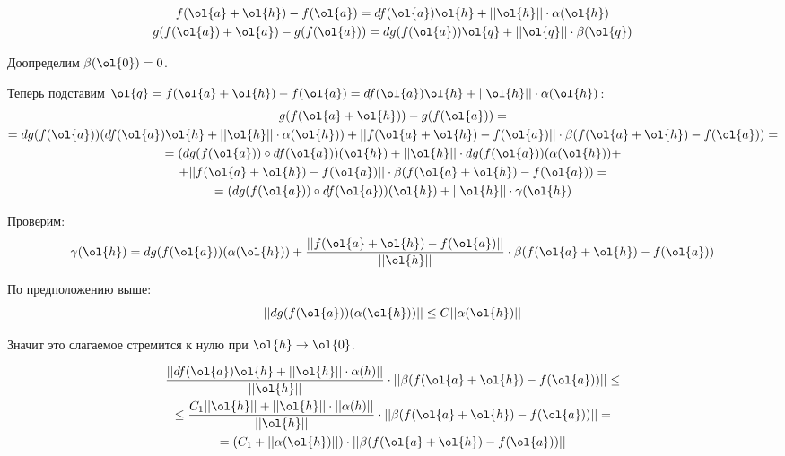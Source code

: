 \begin{gather*}
    f(\ol{a} + \ol{h}) - f(\ol{a}) = df(\ol{a}) \ol{h} + || \ol{h} || \cdot \alpha (\ol{h})
    \\
    g(f(\ol{a}) + \ol{a}) - g(f(\ol{a})) = dg(f(\ol{a})) \ol{q} + || \ol{q} || \cdot \beta (\ol{q})
\end{gather*}

Доопределим \( \beta(\ol{0}) = 0 \).

Теперь подставим \( \ol{q} = f(\ol{a} + \ol{h}) - f(\ol{a}) = df(\ol{a}) \ol{h} + || \ol{h} || \cdot \alpha (\ol{h}) \):
\begin{gather*}
    g(f(\ol{a} + \ol{h})) - g(f(\ol{a}))
    =
    \\
    =
    dg(f(\ol{a})) ( df(\ol{a}) \ol{h} + || \ol{h} || \cdot \alpha (\ol{h}) )
        +
        || f(\ol{a} + \ol{h}) - f(\ol{a}) || \cdot \beta (f(\ol{a} + \ol{h}) - f(\ol{a}))
    =
    \\
    =
    (dg(f(\ol{a})) \circ df (\ol{a})) ( \ol{h} )
        +
        || \ol{h} || \cdot dg ( f(\ol{a}) ) ( \alpha(\ol{h}) )
        +
        \\
        +
        || f(\ol{a} + \ol{h}) - f(\ol{a}) || \cdot \beta (f(\ol{a} + \ol{h}) - f(\ol{a}))
    =
    \\
    =
    (dg(f(\ol{a})) \circ df (\ol{a})) ( \ol{h} ) + || \ol{h} || \cdot \gamma (\ol{h})
\end{gather*}

Проверим:
\[
    \gamma(\ol{h})
    =
    dg ( f(\ol{a}) ) ( \alpha(\ol{h}) )
    +
    \frac{|| f(\ol{a} + \ol{h}) - f(\ol{a}) ||}{|| \ol{h} ||} \cdot \beta (f(\ol{a} + \ol{h}) - f(\ol{a}))
\]

По предположению выше:
\[
    || dg ( f(\ol{a}) ) ( \alpha(\ol{h}) ) || \leq C || \alpha ( \ol{h} ) ||
\]

Значит это слагаемое стремится к нулю при \( \ol{h} \to \ol{0} \).

\begin{gather*}
    \frac{|| df(\ol{a}) \ol{h} + || \ol{h} || \cdot \alpha(h) ||}{|| \ol{h} ||} \cdot || \beta (f(\ol{a} + \ol{h}) - f(\ol{a})) ||
    \leq
    \\
    \leq
    \frac{C_1 || \ol{h} || + || \ol{h} || \cdot || \alpha(h) ||}{|| \ol{h} ||} \cdot || \beta (f(\ol{a} + \ol{h}) - f(\ol{a})) ||
    =
    \\
    =
    (C_1 + || \alpha(\ol{h}) ||) \cdot || \beta (f(\ol{a} + \ol{h}) - f(\ol{a})) ||
\end{gather*}

